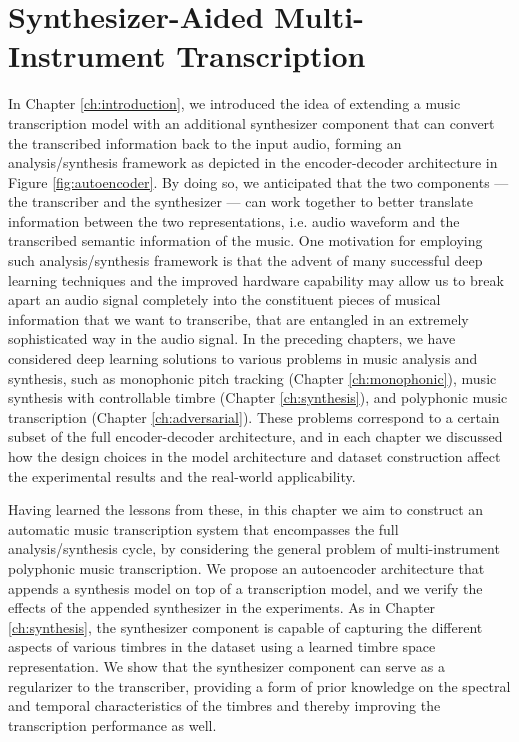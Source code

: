 
\graphicspath{{7-timbre/figures/}}

\chapter{Synthesizer-Aided Multi-Instrument Transcription}
\label{ch:timbre}

In Chapter \ref{ch:introduction}, we introduced the idea of extending a music transcription model with an additional synthesizer component that can convert the transcribed information back to the input audio, forming an analysis/synthesis framework as depicted in the encoder-decoder architecture in Figure \ref{fig:autoencoder}.
By doing so, we anticipated that the two components --- the transcriber and the synthesizer --- can work together to better translate information between the two representations, i.e. audio waveform and the transcribed semantic information of the music.
One motivation for employing such analysis/synthesis framework is that the advent of many successful deep learning techniques and the improved hardware capability may allow us to break apart an audio signal completely into the constituent pieces of musical information that we want to transcribe, that are entangled in an extremely sophisticated way in the audio signal.
In the preceding chapters, we have considered deep learning solutions to various problems in music analysis and synthesis, such as monophonic pitch tracking (Chapter \ref{ch:monophonic}), music synthesis with controllable timbre (Chapter \ref{ch:synthesis}), and polyphonic music transcription (Chapter \ref{ch:adversarial}).
These problems correspond to a certain subset of the full encoder-decoder architecture, and in each chapter we discussed how the design choices in the model architecture and dataset construction affect the experimental results and the real-world applicability.

Having learned the lessons from these, in this chapter we aim to construct an automatic music transcription system that encompasses the full analysis/synthesis cycle, by considering the general problem of multi-instrument polyphonic music transcription.
We propose an autoencoder architecture that appends a synthesis model on top of a transcription model, and we verify the effects of the appended synthesizer in the experiments.
As in Chapter \ref{ch:synthesis}, the synthesizer component is capable of capturing the different aspects of various timbres in the dataset using a learned timbre space representation.
We show that the synthesizer component can serve as a regularizer to the transcriber, providing a form of prior knowledge on the spectral and temporal characteristics of the timbres and thereby improving the transcription performance as well.

